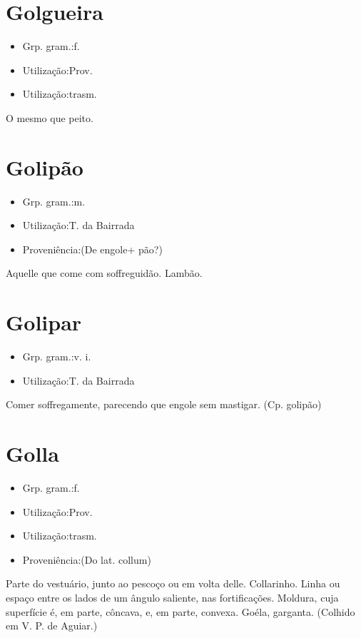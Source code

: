 \section{Golgueira}
\begin{itemize}
\item {Grp. gram.:f.}
\end{itemize}
\begin{itemize}
\item {Utilização:Prov.}
\end{itemize}
\begin{itemize}
\item {Utilização:trasm.}
\end{itemize}
O mesmo que \textunderscore peito\textunderscore .
\section{Golipão}
\begin{itemize}
\item {Grp. gram.:m.}
\end{itemize}
\begin{itemize}
\item {Utilização:T. da Bairrada}
\end{itemize}
\begin{itemize}
\item {Proveniência:(De \textunderscore engole\textunderscore  + \textunderscore pão\textunderscore ?)}
\end{itemize}
Aquelle que come com soffreguidão.
Lambão.
\section{Golipar}
\begin{itemize}
\item {Grp. gram.:v. i.}
\end{itemize}
\begin{itemize}
\item {Utilização:T. da Bairrada}
\end{itemize}
Comer soffregamente, parecendo que engole sem mastigar.
(Cp. \textunderscore golipão\textunderscore )
\section{Golla}
\begin{itemize}
\item {Grp. gram.:f.}
\end{itemize}
\begin{itemize}
\item {Utilização:Prov.}
\end{itemize}
\begin{itemize}
\item {Utilização:trasm.}
\end{itemize}
\begin{itemize}
\item {Proveniência:(Do lat. \textunderscore collum\textunderscore )}
\end{itemize}
Parte do vestuário, junto ao pescoço ou em volta delle.
Collarinho.
Linha ou espaço entre os lados de um ângulo saliente, nas fortificações.
Moldura, cuja superfície é, em parte, côncava, e, em parte, convexa.
Goéla, garganta. (Colhido em V. P. de Aguiar.)
